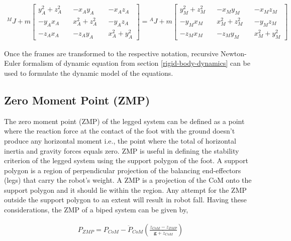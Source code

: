 \begin{align}
    \label{eq: translation-frame}
        {^M}J + m \begin{bmatrix}
            y^2_A + z^2_A && -x_Ay_A && -x_Az_A \\
            -y_Ax_A && x^2_A + z^2_A && -y_Az_A \\
            -z_Ax_A && -z_Ay_A && x^2_A+y^2_A
        \end{bmatrix} = {^A}J + m \begin{bmatrix}
            y^2_M + z^2_M && -x_My_M && -x_Mz_M \\
            -y_Mx_M && x^2_M + z^2_M && -y_Mz_M \\
            -z_Mx_M && -z_My_M && x^2_M+y^2_M
        \end{bmatrix}
\end{align}


Once the frames are transformed to the respective notation, recursive Newton-Euler formalism of dynamic equation from section \ref{rigid-body-dynamics}
can be used to formulate the dynamic model of the equations.


\subsection{Zero Moment Point (ZMP)}

The zero moment point (ZMP) of the legged system can be defined as a point where the reaction force at the contact 
of the foot with the ground doesn't produce any horizontal moment i.e., the point where the total of horizontal inertia and
gravity forces equals zero. ZMP is useful in defining the stability criterion of the legged system using the support polygon of 
the foot. A support polygon is a region of perpendicular projection of the balancing end-effectors (legs) that carry the robot's weight.
A ZMP is a projection of the CoM onto the support polygon and it should lie within the region. Any attempt for the ZMP 
outside the support polygon to an extent will result in robot fall. Having these considerations, the ZMP of a biped system
can be given by,

\begin{equation}
    \begin{split}
        P_{ZMP} = P_{CoM} - \ddot{P}_{CoM}(\frac{z_{CoM} - z_{ZMP}}{\mathbf{g} + \ddot{z}_{CoM}})
    \end{split}
\end{equation}

